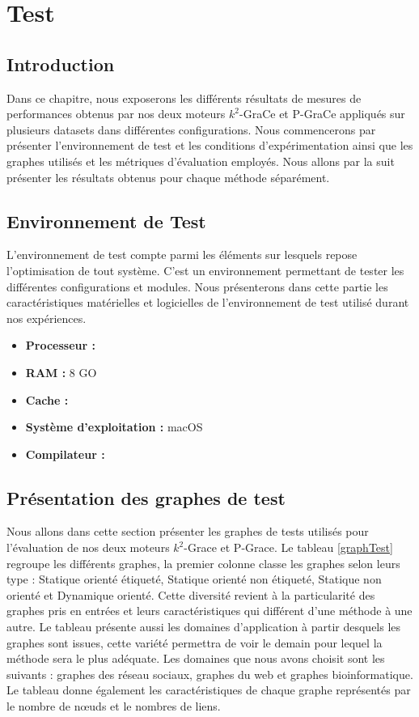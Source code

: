 \chapter{Test}
	\section{Introduction}
	
Dans ce chapitre, nous exposerons les différents résultats de mesures de performances obtenus par nos deux moteurs $k^2$-GraCe et P-GraCe appliqués sur plusieurs datasets dans différentes configurations. Nous commencerons par présenter l'environnement de test et les conditions d'expérimentation ainsi que les graphes utilisés et les métriques d'évaluation employés. Nous allons par la suit présenter les résultats obtenus pour chaque méthode séparément. 


	
	
	\section{Environnement de Test}
	L'environnement de test compte parmi les éléments sur lesquels repose l'optimisation de tout système. C'est un environnement permettant de tester les différentes configurations et modules. Nous présenterons dans cette partie les caractéristiques matérielles et logicielles de l'environnement de test utilisé durant nos expériences. 

	
	\begin{itemize}[label=$\bullet$]
		\item \textbf{Processeur :}
		\item \textbf{RAM : }8 GO
		\item \textbf{Cache :}
		\item \textbf{Système d'exploitation : }macOS 
		\item \textbf{Compilateur :}
	\end{itemize}
	\section{Présentation des graphes de test}
	Nous allons dans cette section présenter les graphes de tests utilisés pour l'évaluation de nos deux moteurs $k^2$-Grace et P-Grace. 
	 Le tableau \ref{graphTest} regroupe les différents graphes, la premier colonne classe les graphes selon leurs type : Statique orienté étiqueté, Statique orienté non étiqueté, Statique non orienté et Dynamique orienté. Cette diversité revient à la particularité des graphes pris en entrées et leurs caractéristiques qui différent d'une méthode à une autre.
Le tableau présente aussi les domaines d'application à partir desquels  les graphes sont issues, cette variété permettra de voir le demain pour lequel la méthode sera le plus adéquate. Les domaines que nous avons choisit sont les suivants : graphes des réseau sociaux, graphes du web et graphes bioinformatique. Le tableau donne également les caractéristiques de chaque graphe représentés par le nombre de nœuds et le nombres de liens. 
	 

